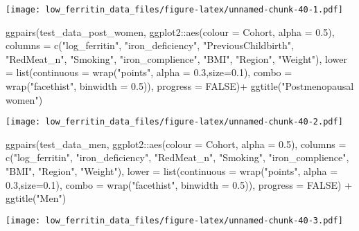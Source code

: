 \documentclass[
]{article}
\newenvironment{Shaded}{\begin{snugshade}}{\end{snugshade}}
\newcommand{\AttributeTok}[1]{\textcolor[rgb]{0.77,0.63,0.00}{#1}}
\newcommand{\ConstantTok}[1]{\textcolor[rgb]{0.00,0.00,0.00}{#1}}
\newcommand{\FloatTok}[1]{\textcolor[rgb]{0.00,0.00,0.81}{#1}}
\newcommand{\FunctionTok}[1]{\textcolor[rgb]{0.00,0.00,0.00}{#1}}
\newcommand{\NormalTok}[1]{#1}
\newcommand{\SpecialCharTok}[1]{\textcolor[rgb]{0.00,0.00,0.00}{#1}}
\newcommand{\StringTok}[1]{\textcolor[rgb]{0.31,0.60,0.02}{#1}}
\begin{document}
\texttt{[image: low\_ferritin\_data\_files/figure-latex/unnamed-chunk-40-1.pdf]}

\begin{Shaded}
\begin{Highlighting}[]
\FunctionTok{ggpairs}\NormalTok{(test\_data\_post\_women, ggplot2}\SpecialCharTok{::}\FunctionTok{aes}\NormalTok{(}\AttributeTok{colour =}\NormalTok{ Cohort, }\AttributeTok{alpha =} \FloatTok{0.5}\NormalTok{), }
        \AttributeTok{columns =} \FunctionTok{c}\NormalTok{(}\StringTok{"log\_ferritin"}\NormalTok{, }\StringTok{"iron\_deficiency"}\NormalTok{, }\StringTok{"PreviousChildbirth"}\NormalTok{,  }\StringTok{"RedMeat\_n"}\NormalTok{, }\StringTok{"Smoking"}\NormalTok{, }\StringTok{"iron\_complience"}\NormalTok{, }\StringTok{"BMI"}\NormalTok{, }\StringTok{"Region"}\NormalTok{, }\StringTok{"Weight"}\NormalTok{),}
         \AttributeTok{lower =} \FunctionTok{list}\NormalTok{(}\AttributeTok{continuous =} \FunctionTok{wrap}\NormalTok{(}\StringTok{"points"}\NormalTok{, }\AttributeTok{alpha =} \FloatTok{0.3}\NormalTok{,}\AttributeTok{size=}\FloatTok{0.1}\NormalTok{),}
                      \AttributeTok{combo =} \FunctionTok{wrap}\NormalTok{(}\StringTok{"facethist"}\NormalTok{, }\AttributeTok{binwidth =} \FloatTok{0.5}\NormalTok{)),}
        \AttributeTok{progress =} \ConstantTok{FALSE}\NormalTok{)}\SpecialCharTok{+} 
\FunctionTok{ggtitle}\NormalTok{(}\StringTok{"Postmenopausal women"}\NormalTok{)}
\end{Highlighting}
\end{Shaded}

\texttt{[image: low\_ferritin\_data\_files/figure-latex/unnamed-chunk-40-2.pdf]}

\begin{Shaded}
\begin{Highlighting}[]
\FunctionTok{ggpairs}\NormalTok{(test\_data\_men, ggplot2}\SpecialCharTok{::}\FunctionTok{aes}\NormalTok{(}\AttributeTok{colour =}\NormalTok{ Cohort, }\AttributeTok{alpha =} \FloatTok{0.5}\NormalTok{),}
        \AttributeTok{columns =} \FunctionTok{c}\NormalTok{(}\StringTok{"log\_ferritin"}\NormalTok{, }\StringTok{"iron\_deficiency"}\NormalTok{,  }\StringTok{"RedMeat\_n"}\NormalTok{, }\StringTok{"Smoking"}\NormalTok{, }\StringTok{"iron\_complience"}\NormalTok{, }\StringTok{"BMI"}\NormalTok{, }\StringTok{"Region"}\NormalTok{, }\StringTok{"Weight"}\NormalTok{),}
         \AttributeTok{lower =} \FunctionTok{list}\NormalTok{(}\AttributeTok{continuous =} \FunctionTok{wrap}\NormalTok{(}\StringTok{"points"}\NormalTok{, }\AttributeTok{alpha =} \FloatTok{0.3}\NormalTok{,}\AttributeTok{size=}\FloatTok{0.1}\NormalTok{),}
                      \AttributeTok{combo =} \FunctionTok{wrap}\NormalTok{(}\StringTok{"facethist"}\NormalTok{, }\AttributeTok{binwidth =} \FloatTok{0.5}\NormalTok{)),}
        \AttributeTok{progress =} \ConstantTok{FALSE}\NormalTok{) }\SpecialCharTok{+} 
\FunctionTok{ggtitle}\NormalTok{(}\StringTok{"Men"}\NormalTok{)}
\end{Highlighting}
\end{Shaded}

\texttt{[image: low\_ferritin\_data\_files/figure-latex/unnamed-chunk-40-3.pdf]}
\end{document}
